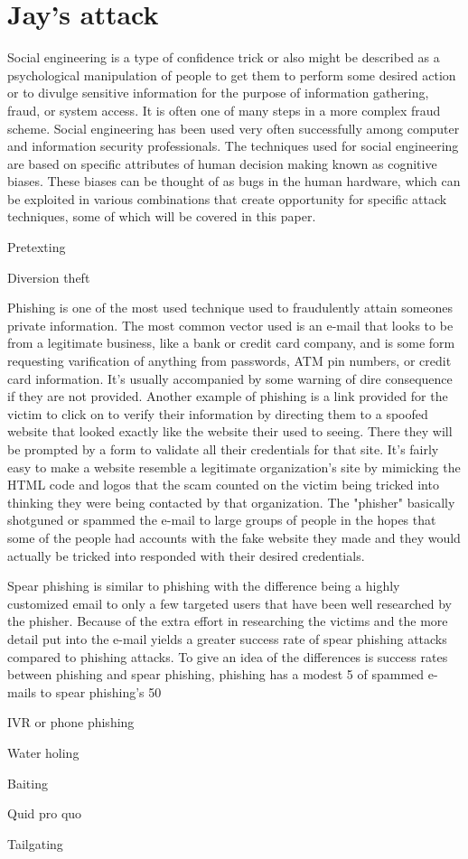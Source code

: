 \section{Jay's attack}

Social engineering is a type of confidence trick or also might be described as a psychological manipulation of people to get them to perform some desired action or to
divulge sensitive information for the purpose of information gathering, fraud, or system access. It is often one of many steps in a more complex fraud scheme.
Social engineering has been used very often successfully among computer and information security professionals.
The techniques used for social engineering are based on specific attributes of human decision making known as cognitive biases. These biases can be thought of as bugs
in the human hardware, which can be exploited in various combinations that create opportunity for specific attack techniques, some of which will be covered in this
paper. 

Pretexting

Diversion theft

Phishing is one of the most used technique used to fraudulently attain someones private information. The most common vector used is an e-mail that looks to be from a
legitimate business, like a bank or credit card company, and is some form requesting varification of anything from passwords, ATM pin numbers, or credit card
information. It's usually accompanied by some warning of dire consequence if they are not provided. Another example of phishing is a link provided for the victim to
click on to verify their information by directing them to a spoofed website that looked exactly like the website their used to seeing. There they will be prompted by
a form to validate all their credentials for that site. It's fairly easy to make a website resemble a legitimate organization's site by mimicking the HTML code and
logos that the scam counted on the victim being tricked into thinking they were being contacted by that organization. The "phisher" basically shotguned or spammed
the e-mail to large groups of people in the hopes that some of the people had accounts with the fake website they made and they would actually be tricked into
responded with their desired credentials.

Spear phishing is similar to phishing with the difference being a highly customized email to only a few targeted users that have been well researched by the phisher.
Because of the extra effort in researching the victims and the more detail put into the e-mail yields a greater success rate of spear phishing attacks compared to
phishing attacks. To give an idea of the differences is success rates between phishing and spear phishing, phishing has a modest 5%
of spammed e-mails to spear phishing's 50%

IVR or phone phishing

Water holing

Baiting

Quid pro quo

Tailgating